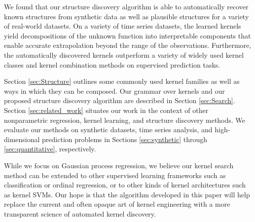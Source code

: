 \documentclass[twoside]{article}
\begin{document}
We found that our structure discovery algorithm is able to automatically recover known structures from synthetic data as well as plausible structures for a variety of real-world datasets. 
On a variety of time series datasets, the learned kernels yield decompositions of the unknown function into interpretable components that enable accurate extrapolation beyond the range of the observations.
Furthermore, the automatically discovered kernels outperform a variety of widely used kernel classes and kernel combination methods on supervised prediction tasks.

Section \ref{sec:Structure} outlines some commonly used kernel families as well as ways in which they can be composed. 
Our grammar over kernels and our proposed structure discovery algorithm are described in Section \ref{sec:Search}. 
Section \ref{sec:related_work} situates our work in the context of other nonparametric regression, kernel learning, and structure discovery methods.
We evaluate our methods on synthetic datasets, time series analysis, and high-dimensional prediction problems in Sections \ref{sec:synthetic} through \ref{sec:quantitative}, respectively.

While we focus on Gaussian process regression, we believe our kernel search method can be extended to other supervised learning frameworks such as classification or ordinal regression, or to other kinds of kernel architectures such as kernel SVMs.
Our hope is that the algorithm developed in this paper will help replace the current and often opaque art of kernel engineering with a more transparent science of automated kernel discovery.


\end{document}

